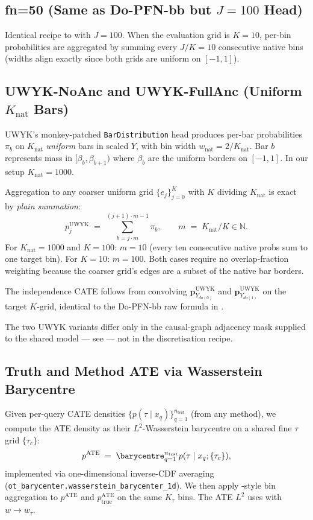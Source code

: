 \subsection{fn=50 (Same as Do-PFN-bb but $J{=}100$ Head)}
Identical recipe to  with $J = 100$.  When the
evaluation grid is $K = 10$, per-bin probabilities are aggregated by
summing every $J/K = 10$ consecutive native bins (widths align exactly
since both grids are uniform on $[-1, 1]$).

\subsection{UWYK-NoAnc and UWYK-FullAnc (Uniform $K_{\text{nat}}$ Bars)}
\label{app:uwyk}
UWYK's monkey-patched \texttt{BarDistribution} head produces per-bar
probabilities $\pi_b$ on $K_{\text{nat}}$ \emph{uniform} bars in scaled
$Y$, with bin width $w_{\text{nat}} = 2/K_{\text{nat}}$.  Bar $b$
represents mass in $[\beta_b, \beta_{b+1})$ where $\beta_b$ are the
uniform borders on $[-1, 1]$.  In our setup $K_{\text{nat}} = 1000$.

Aggregation to any coarser uniform grid $\{e_j\}_{j=0}^{K}$ with $K$
dividing $K_{\text{nat}}$ is exact by \emph{plain summation}:
\begin{equation}
\label{eq:uwyk-sum}
p^{\mathrm{UWYK}}_j \;=\;
   \sum_{b = j\cdot m}^{(j+1)\cdot m - 1} \pi_b,
\qquad
m \;=\; K_{\text{nat}} / K \in \mathbb{N}.
\end{equation}
For $K_{\text{nat}} = 1000$ and $K = 100$: $m = 10$ (every ten
consecutive native probs sum to one target bin).  For $K = 10$:
$m = 100$.  Both cases require no overlap-fraction weighting because
the coarser grid's edges are a subset of the native bar borders.

The independence CATE follows from convolving $\mathbf{p}^{\mathrm{UWYK}}_{Y_{do(0)}}$
and $\mathbf{p}^{\mathrm{UWYK}}_{Y_{do(1)}}$ on the target $K$-grid,
identical to the Do-PFN-bb raw formula in .

The two UWYK variants differ only in the causal-graph adjacency mask
supplied to the shared model — see \citet{uwyk} — not in the discretisation
recipe.

\subsection{Truth and Method ATE via Wasserstein Barycentre}
\label{app:ate}
Given per-query CATE densities $\{p(\tau\mid x_q)\}_{q=1}^{n_{\text{test}}}$
(from any method), we compute the ATE density as their $L^2$-Wasserstein
barycentre on a shared fine $\tau$ grid $\{\tau_c\}$:
\[
p^{\mathrm{ATE}} \;=\; \barycentre_{q=1}^{n_{\text{test}}}
   p(\tau \mid x_q; \{\tau_c\}),
\]
implemented via one-dimensional inverse-CDF averaging
(\texttt{ot\_barycenter.wasserstein\_barycenter\_1d}).  We then apply
-style bin aggregation to $p^{\mathrm{ATE}}$ and
$p^{\mathrm{ATE}}_{\text{true}}$ on the same $K_\tau$ bins.  The ATE
$L^2$ uses  with $w \to w_\tau$.

